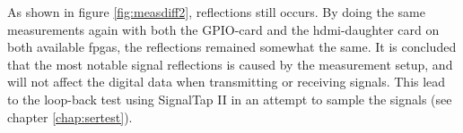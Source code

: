 \documentclass[main.tex]{subfiles}
\begin{document}
\begin{figure}[H]
   \begin{floatrow}
   \end{floatrow}
\end{figure}

As shown in figure \ref{fig:measdiff2}, reflections still occurs. By doing the same measurements again with both the GPIO-card and the \gls{hdmi}-daughter card on both available \glspl{fpga}, the reflections remained somewhat the same. It is concluded that the most notable signal reflections is caused by the measurement setup, and will not affect the digital data when transmitting or receiving signals. This lead to the loop-back test using SignalTap II in an attempt to sample the signals (see chapter \ref{chap:sertest}).
\end{document}
